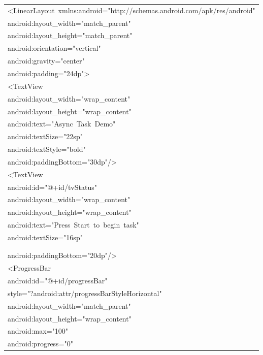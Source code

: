 \documentclass[a4paper,12pt]{article}
\begin{document}
\begin{longtable}{|p{}|}
{\ttfamily\small \textless{}LinearLayout\ xmlns:android="http://schemas.android.com/apk/res/android"} \\
{\ttfamily\small android:layout\_width="match\_parent"} \\
{\ttfamily\small android:layout\_height="match\_parent"} \\
{\ttfamily\small android:orientation="vertical"} \\
{\ttfamily\small android:gravity="center"} \\
{\ttfamily\small android:padding="24dp"\textgreater{}} \\
{\ttfamily\small \textless{}TextView} \\
{\ttfamily\small android:layout\_width="wrap\_content"} \\
{\ttfamily\small android:layout\_height="wrap\_content"} \\
{\ttfamily\small android:text="Async\ Task\ Demo"} \\
{\ttfamily\small android:textSize="22sp"} \\
{\ttfamily\small android:textStyle="bold"} \\
{\ttfamily\small android:paddingBottom="30dp"/\textgreater{}} \\
{\ttfamily\small \textless{}TextView} \\
{\ttfamily\small android:id="@+id/tvStatus"} \\
{\ttfamily\small android:layout\_width="wrap\_content"} \\
{\ttfamily\small android:layout\_height="wrap\_content"} \\
{\ttfamily\small android:text="Press\ Start\ to\ begin\ task"} \\
{\ttfamily\small android:textSize="16sp"} \\
\strut \\
\strut \\
{\ttfamily\small android:paddingBottom="20dp"/\textgreater{}} \\
{\ttfamily\small \textless{}ProgressBar} \\
{\ttfamily\small android:id="@+id/progressBar"} \\
{\ttfamily\small style="?android:attr/progressBarStyleHorizontal"} \\
{\ttfamily\small android:layout\_width="match\_parent"} \\
{\ttfamily\small android:layout\_height="wrap\_content"} \\
{\ttfamily\small android:max="100"} \\
{\ttfamily\small android:progress="0"} \\

\end{longtable}
\end{document}
